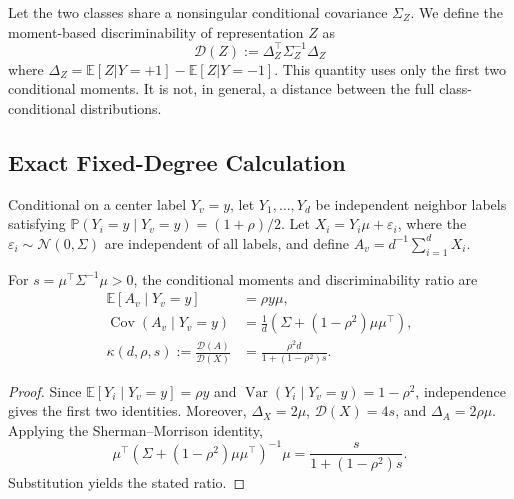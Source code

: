 \begin{definition}
\label{def:discriminability}
Let the two classes share a nonsingular conditional covariance $\Sigma_Z$. We define the moment-based discriminability of representation $Z$ as
\begin{equation}
    \mathcal{D}(Z) := \Delta_Z^\top \Sigma_Z^{-1} \Delta_Z
\end{equation}
where $\Delta_Z = \mathbb{E}[Z|Y=+1] - \mathbb{E}[Z|Y=-1]$. This quantity uses only the first two conditional moments. It is not, in general, a distance between the full class-conditional distributions.
\end{definition}

\subsection{Exact Fixed-Degree Calculation}

Conditional on a center label $Y_v=y$, let $Y_1,\ldots,Y_d$ be independent neighbor labels satisfying $\mathbb{P}(Y_i=y\mid Y_v=y)=(1+\rho)/2$. Let $X_i=Y_i\mu+\varepsilon_i$, where the $\varepsilon_i\sim\mathcal{N}(0,\Sigma)$ are independent of all labels, and define $A_v=d^{-1}\sum_{i=1}^d X_i$.

\begin{proposition}
\label{prop:fixed_degree}
For $s=\mu^\top\Sigma^{-1}\mu>0$, the conditional moments and discriminability ratio are
\begin{align}
    \mathbb{E}[A_v\mid Y_v=y] &= \rho y\mu,\\
    \operatorname{Cov}(A_v\mid Y_v=y)
        &= \frac{1}{d}\left(\Sigma+(1-\rho^2)\mu\mu^\top\right),\\
    \kappa(d,\rho,s)
        :=\frac{\mathcal{D}(A)}{\mathcal{D}(X)}
        &=\frac{\rho^2d}{1+(1-\rho^2)s}.
\end{align}
\end{proposition}

\begin{proof}


Since $\mathbb{E}[Y_i\mid Y_v=y]=\rho y$ and
$\operatorname{Var}(Y_i\mid Y_v=y)=1-\rho^2$, independence gives the first two identities. Moreover, $\Delta_X=2\mu$, $\mathcal{D}(X)=4s$, and $\Delta_A=2\rho\mu$. Applying the Sherman--Morrison identity,
\begin{equation}
 \mu^\top\left(\Sigma+(1-\rho^2)\mu\mu^\top\right)^{-1}\mu
 =\frac{s}{1+(1-\rho^2)s}.
\end{equation}
Substitution yields the stated ratio.
\end{proof}

